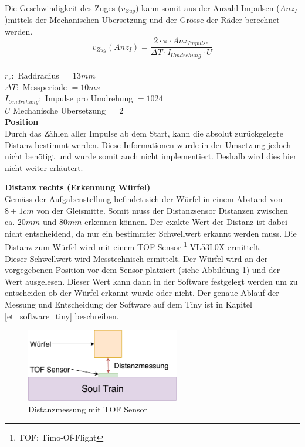 \documentclass[../../main.tex]{subfiles}
\begin{document}
    Die Geschwindigkeit des Zuges ($v_{Zug}$) kann somit aus der Anzahl Impulsen ($Anz_{I}$)mittels der Mechanischen Übersetzung und der Grösse der Räder berechnet werden.
    $$v_{Zug}(Anz_{I}) = \frac{2 \cdot \pi \cdot Anz_{Impulse}}{\Delta T \cdot I_{Umdrehung} \cdot U}$$\\
    $r_r:$ Raddradius  $=13mm$\\
    $\Delta T:$  Messperiode  $=10ms$\\
    $I_{Umdrehung}:$  Impulse pro Umdrehung  $=1024$\\
    $U$  Mechanische Übersetzung  $=2$\\

    \textbf{Position}\\
    Durch das Zählen aller Impulse ab dem Start, kann die absolut zurückgelegte Distanz bestimmt werden. Diese Informationen wurde in der Umsetzung jedoch nicht benötigt und wurde somit auch nicht implementiert. Deshalb wird dies hier nicht weiter erläutert.

    
    \textbf{Distanz rechts (Erkennung Würfel) }\\
    Gemäss der Aufgabenstellung befindet sich der Würfel in einem Abstand von $8\pm1cm$ von der Gleismitte. Somit muss der Distanzsensor Distanzen zwischen ca. $20mm$ und $80mm$ erkennen können. Der exakte Wert der Distanz ist dabei nicht entscheidend, da nur ein bestimmter Schwellwert erkannt werden muss. Die Distanz zum Würfel wird mit einem TOF Sensor \footnote{TOF: Timo-Of-Flight} VL53L0X ermittelt. \\
    Dieser Schwellwert wird Messtechnisch ermittelt. Der Würfel wird an der vorgegebenen Position vor dem Sensor platziert (siehe Abbildung \ref{fig:et_tof_messung}) und der Wert ausgelesen. Dieser Wert kann dann in der Software festgelegt werden um zu entscheiden ob der Würfel erkannt wurde oder nicht. Der genaue Ablauf der Messung und Entscheidung der Software auf dem Tiny ist in Kapitel \ref{et_software_tiny} beschreiben.

    \begin{figure}[H]
        \centering
        \includegraphics[width=0.6\textwidth]{../../images/et/et_tof_messung.pdf}
        \caption {Distanzmessung mit TOF Sensor}
        \label{fig:et_tof_messung}
    \end{figure}
\end{document}
